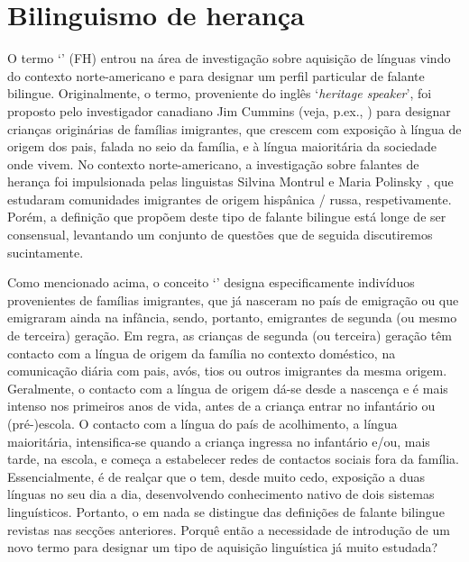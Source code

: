 \documentclass[output=paper]{LSP/langsci}
\begin{document}
\section{Bilinguismo de herança}%
\label{sec:almeida_bilinguismo_heranca}

O termo `' (FH) entrou na área de investigação sobre aquisição de línguas vindo do contexto norte-americano e para designar um perfil particular de falante bilingue. Originalmente, o termo, proveniente do inglês `\textit{heritage speaker}', foi proposto pelo investigador canadiano Jim Cummins (veja, p.ex., \citealt{cummins1989}) para designar crianças originárias de famílias imigrantes, que crescem com exposição à língua de origem dos pais, falada no seio da família, e à língua maioritária da sociedade onde vivem. No contexto norte-americano, a investigação sobre falantes de herança foi impulsionada pelas linguistas Silvina Montrul e Maria Polinsky \citep{montrul2008,polinsky2008}, que estudaram comunidades imigrantes de origem hispânica / russa, respetivamente. Porém, a definição que propõem deste tipo de falante bilingue está longe de ser consensual, levantando um conjunto de questões que de seguida discutiremos sucintamente.

Como mencionado acima, o conceito `' designa especificamente indivíduos provenientes de famílias imigrantes, que já nasceram no país de emigração ou que emigraram ainda na infância, sendo, portanto, emigrantes de segunda (ou mesmo de terceira) geração. Em regra, as crianças de segunda (ou terceira) geração têm contacto com a língua de origem da família no contexto doméstico, na comunicação diária com pais, avós, tios ou outros imigrantes da mesma origem. Geralmente, o contacto com a língua de origem dá-se desde a nascença e é mais intenso nos primeiros anos de vida, antes de a criança entrar no infantário ou (pré-)escola. O contacto com a língua do país de acolhimento, a língua maioritária, intensifica-se quando a criança ingressa no infantário e/ou, mais tarde, na escola, e começa a estabelecer redes de contactos sociais fora da família. Essencialmente, é de realçar que o  tem, desde muito cedo, exposição a duas línguas no seu dia a dia, desenvolvendo conhecimento nativo de dois sistemas linguísticos. Portanto, o  em nada se distingue das definições de falante bilingue revistas nas secções anteriores. Porquê então a necessidade de introdução de um novo termo para designar um tipo de aquisição linguística já muito estudada?
\end{document}
